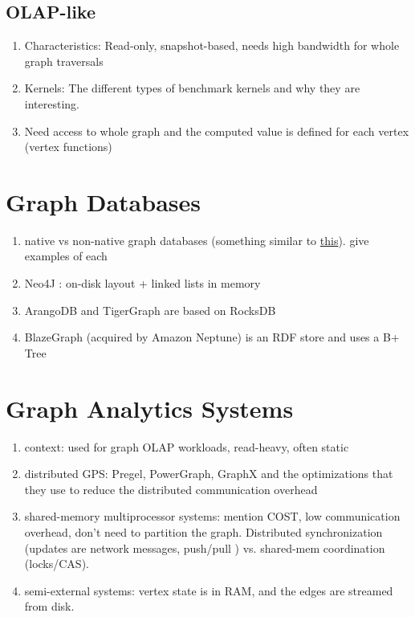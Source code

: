 \subsection{OLAP-like}
\begin{enumerate}
    \item Characteristics: Read-only, snapshot-based, needs high bandwidth for whole graph traversals
    \item Kernels: The different types of benchmark kernels and why they are interesting. 
    \item Need access to whole graph and the computed value is defined for each vertex (vertex functions)
\end{enumerate}

\section{Graph Databases}
\begin{enumerate}
    \item native vs non-native graph databases (something similar to \href{https://neo4j.com/blog/native-vs-non-native-graph-technology/}{this}). give examples of each
    \item Neo4J : on-disk layout + linked lists in memory
    \item ArangoDB and TigerGraph are based on RocksDB
    \item BlazeGraph (acquired by Amazon Neptune) is an RDF store and uses a B+ Tree 
\end{enumerate}

\section{Graph Analytics Systems}
\begin{enumerate}
    \item context: used for graph OLAP workloads, read-heavy, often static
    \item distributed GPS: Pregel, PowerGraph, GraphX and the optimizations that they use to reduce the distributed communication overhead
    \item shared-memory multiprocessor systems: mention COST, low communication overhead, don't need to partition the graph. Distributed synchronization (updates are network messages, push/pull ) vs. shared-mem coordination (locks/CAS).
    \item semi-external systems: vertex state is in RAM, and the edges are streamed from disk. 
\end{enumerate}

